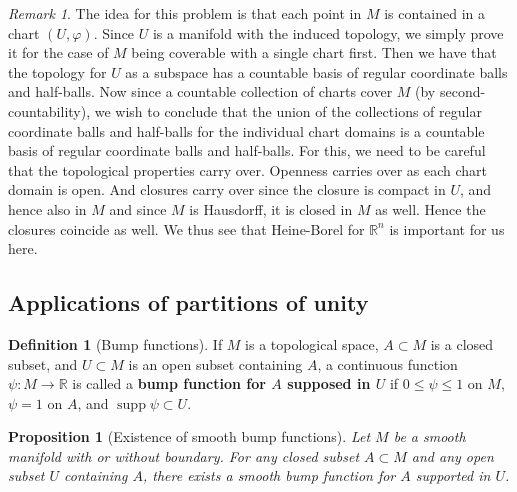 \documentclass[reqno]{amsart}
\theoremstyle{plain}%
\newtheorem{proposition}[theorem]{Proposition}
\theoremstyle{definition}
\newtheorem{definition}[theorem]{Definition}
\theoremstyle{remark}
\newtheorem*{remark}{Remark}
\DeclareMathOperator{\supp}{supp}
\begin{document}
        \begin{remark}
            The idea for this problem is that each point in
            $M$ is contained in a chart $\left( U, \varphi \right) $.
            Since $U$ is a manifold with the induced topology, 
            we simply prove it for the case of $M$ being coverable
            with a single chart first. Then we have that
            the topology for $U$ as a subspace has a countable
            basis of regular coordinate balls and half-balls.
            Now since a countable collection of charts
            cover $M$ (by second-countability), we wish to
            conclude that the union of the collections of
            regular coordinate balls and half-balls for the individual
            chart domains is a countable basis of regular coordinate
            balls and half-balls. For this, we need to be careful
            that the topological properties carry over. 
            Openness carries over as each chart domain is open.
            And closures carry over since the closure is
            compact in $U$, and hence also in $M$ and since
            $M$ is Hausdorff, it is closed in $M$ as well. 
            Hence the closures coincide as well. We thus see
            that Heine-Borel for $\mathbb{R}^{n}$ is important
            for us here.
        \end{remark}

        \subsection{Applications of partitions of unity}

        \begin{definition}[Bump functions]
            If $M$ is a topological space, $A \subset M$ is a closed subset,
            and $U \subset M$ is an open subset containing $A$, a continuous
            function $\psi  \colon M \to \mathbb{R}$ is called a
            \textbf{bump function for $A$ supposed in $U$} if
            $0 \le \psi \le 1$ on $M$, $\psi = 1$ on $A$, and
            $\supp \psi \subset U$.
        \end{definition}

        \begin{proposition}[Existence of smooth bump functions]
            Let $M$ be a smooth manifold with or without boundary. For any
            closed subset $A \subset M$ and any open subset $U$ containing
            $A$, there exists a smooth bump function for $A$ supported in $U$.
        \end{proposition}
\end{document}
